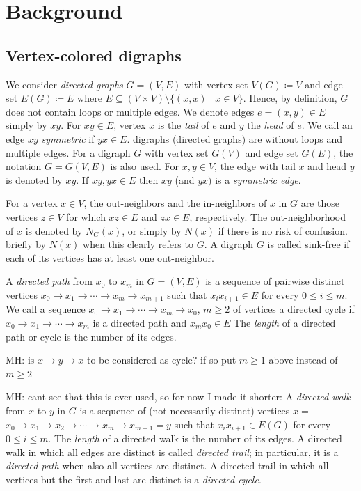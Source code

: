 \documentclass[final,3p,times]{elsarticle}
\newcommand{\TODO}[1]{\begingroup\color{red}#1\endgroup}
\newcommand{\OLD}[1]{\begingroup\tiny\color{gray}#1\endgroup}
\newcommand{\mh}[1]{\begingroup\color{blue}#1\endgroup}
\begin{document}
\section{Background}
\label{sec:background}
\subsection{Vertex-colored digraphs}

\mh{
We consider \emph{directed graphs} $G=(V,E)$ with vertex set $V(G)\coloneqq V$ and edge set $E(G)\coloneqq E$
where $E\subseteq (V\times V)\setminus \{(x,x)\mid x\in V\}$. Hence, by definition, $G$ does not contain 
loops or multiple edges. We denote edges $e=(x,y)\in E$ simply by $xy$. For $xy\in E$, vertex $x$ is the \emph{tail} of $e$
and $y$ the \emph{head} of $e$. We call an edge $xy$ \emph{symmetric} if $yx\in E$. }
\OLD{
digraphs (directed graphs) are without loops and multiple edges. For a digraph $G$ with vertex set $G(V)$ and edge set $G(E)$, the notation $G=G(V,E)$ is also used. For $x,y\in V$,
the edge with tail $x$ and head $y$ is denoted by $xy$. If $xy,yx\in E$ then $xy$ (and $yx)$ is a {\emph{symmetric edge}}.
}

For a vertex $x\in V$, the out-neighbors and the in-neighbors of $x$ in $G$
are those vertices $z\in V$ for which $xz\in E$ and $zx\in E$, respectively. The
out-neighborhood of $x$ is denoted by $N_G(x)$, or 
\mh{simply by  $N(x)$ if there is no risk of confusion.}
\OLD{briefly by $N(x)$ when
this clearly refers to $G$.} A digraph $G$ is called sink-free if each
of its vertices has at least one out-neighbor.

\mh{
A \emph{directed path} from $x_0$ to $x_m$ in $G = (V,E)$ is a sequence of 
pairwise distinct vertices $x_0\rightarrow x_1 \rightarrow \cdots\rightarrow x_m
\rightarrow x_{m+1}$ such that $x_ix_{i+1}\in E$ for every
$0\le i \le m$. 
We call a sequence $x_0\rightarrow x_1 \rightarrow \cdots\rightarrow x_m\rightarrow  x_0$, $m\geq 2$
of vertices a directed cycle if  $x_0\rightarrow x_1 \rightarrow \cdots\rightarrow x_m$
is a directed path and $x_mx_0\in E$
The \emph{length} of a directed path or cycle is the number of its edges.
}

\TODO{MH: is $x\rightarrow y \rightarrow x$ to be considered as cycle? if so put 
$m\geq 1$ above instead of $m\geq 2$}

\OLD{\TODO{MH: cant see that this is ever used, so for now I made it shorter:}
A \emph{directed walk} from $x$ to $y$ in $G$ is a sequence of \mh{(not necessarily
distinct)} vertices
\OLD{$x=$} $x_0\rightarrow x_1 \rightarrow x_2 \rightarrow \cdots\rightarrow x_m
\rightarrow x_{m+1}$\OLD{$=y $} such that $x_ix_{i+1}\in E(G)$ for every
$0\le i \le m$. The \emph{length} of a directed walk is the number of its edges.
A directed walk in which all edges are distinct is called \emph{directed trail};
in particular, it is a \emph{directed path} when also all vertices are distinct.
A directed trail in which all vertices but the first and last are distinct is a
\emph{directed cycle}. 
}
\end{document}

